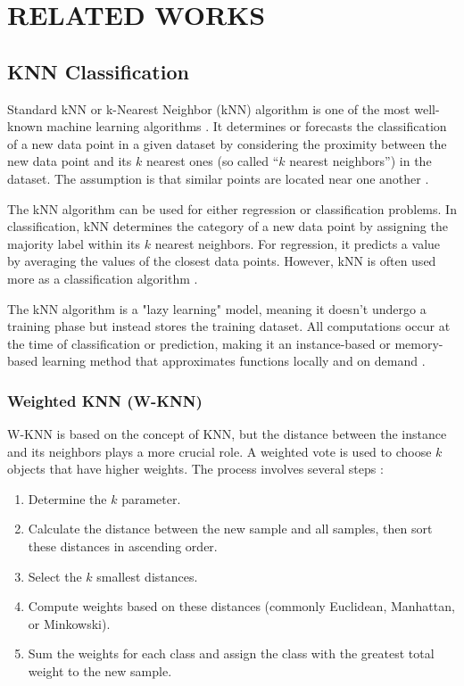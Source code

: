\documentclass[10pt,twocolumn]{article}
\begin{document}
\section{RELATED WORKS}

\subsection{KNN Classification}
Standard kNN or k-Nearest Neighbor (kNN) algorithm is one of the most well-known machine learning algorithms \cite{tarakci2021}. It determines or forecasts the classification of a new data point in a given dataset by considering the proximity between the new data point and its $k$ nearest ones (so called “$k$ nearest neighbors”) in the dataset. The assumption is that similar points are located near one another \cite{ibm2024,elastic2024}.

The kNN algorithm can be used for either regression or classification problems. In classification, kNN determines the category of a new data point by assigning the majority label within its $k$ nearest neighbors. For regression, it predicts a value by averaging the values of the closest data points. However, kNN is often used more as a classification algorithm \cite{ibm2024,elastic2024}.

The kNN algorithm is a "lazy learning" model, meaning it doesn't undergo a training phase but instead stores the training dataset. All computations occur at the time of classification or prediction, making it an instance-based or memory-based learning method that approximates functions locally and on demand \cite{elastic2024,imandoust2013}.

\subsubsection{Weighted KNN (W-KNN)}
W-KNN is based on the concept of KNN, but the distance between the instance and its neighbors plays a more crucial role. A weighted vote is used to choose $k$ objects that have higher weights. The process involves several steps \cite{tarakci2021,yigit2013}:
\begin{enumerate}
    \item Determine the $k$ parameter.
    \item Calculate the distance between the new sample and all samples, then sort these distances in ascending order.
    \item Select the $k$ smallest distances.
    \item Compute weights based on these distances (commonly Euclidean, Manhattan, or Minkowski).
    \item Sum the weights for each class and assign the class with the greatest total weight to the new sample.
\end{enumerate}
\end{document}
